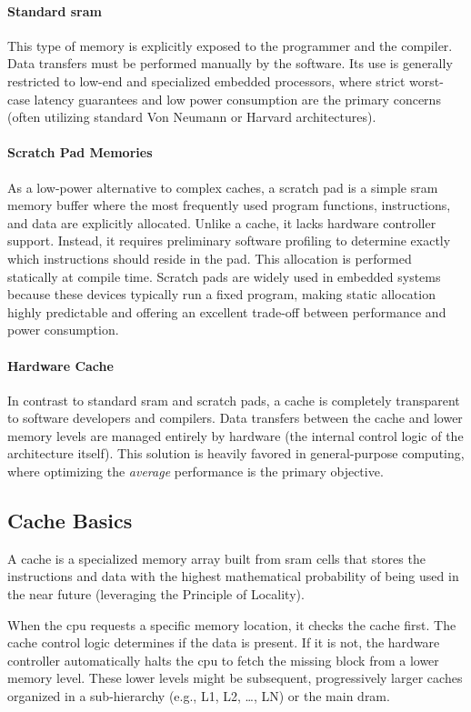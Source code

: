 \paragraph{Standard \gls{sram}} 
This type of memory is explicitly exposed to the programmer and the compiler. Data transfers must be performed manually by the software. Its use is generally restricted to low-end and specialized embedded processors, where strict worst-case latency guarantees and low power consumption are the primary concerns (often utilizing standard Von Neumann or Harvard architectures).

\paragraph{Scratch Pad Memories}
As a low-power alternative to complex caches, a scratch pad is a simple \gls{sram} memory buffer where the most frequently used program functions, instructions, and data are explicitly allocated. Unlike a cache, it lacks hardware controller support. Instead, it requires preliminary software profiling to determine exactly which instructions should reside in the pad. This allocation is performed statically at compile time. Scratch pads are widely used in embedded systems because these devices typically run a fixed program, making static allocation highly predictable and offering an excellent trade-off between performance and power consumption.

\paragraph{Hardware Cache} 
In contrast to standard \gls{sram} and scratch pads, a cache is completely transparent to software developers and compilers. Data transfers between the cache and lower memory levels are managed entirely by hardware (the internal control logic of the architecture itself). This solution is heavily favored in general-purpose computing, where optimizing the \textit{average} performance is the primary objective.

\subsection{Cache Basics}
A cache is a specialized memory array built from \gls{sram} cells that stores the instructions and data with the highest mathematical probability of being used in the near future (leveraging the Principle of Locality). 

When the \gls{cpu} requests a specific memory location, it checks the cache first. The cache control logic determines if the data is present. If it is not, the hardware controller automatically halts the \gls{cpu} to fetch the missing block from a lower memory level. These lower levels might be subsequent, progressively larger caches organized in a sub-hierarchy (e.g., L1, L2, \dots, LN) or the main \gls{dram}.

